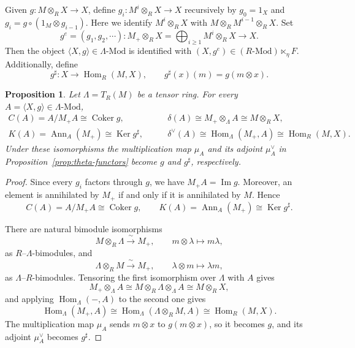 \documentclass[11pt,reqno]{amsart}
\numberwithin{equation}{section}
\newtheorem{proposition}[theorem]{Proposition}
\newcommand{\Hom}{\operatorname{Hom}}
\newcommand{\Coker}{\operatorname{Coker}}
\newcommand{\Ker}{\operatorname{Ker}}
\newcommand{\Mod}{\text{-}\mathrm{Mod}}
\newcommand{\Ima}{\operatorname{Im}}
\newcommand{\Ann}{\operatorname{Ann}}
\begin{document}
Given $g\colon M\otimes_RX\to X$, define $g_i\colon M^i\otimes_RX\to X$ recursively by $g_0=1_X$ and
$g_i=g\circ(1_M\otimes g_{i-1}).$
Here we identify $M^i\otimes_R X$ with $M\otimes_R M^{i-1}\otimes_R X$. Set
\[
g^e=(g_1,g_2,\cdots)
\colon M_+\otimes_RX=\bigoplus_{i\geq 1}M^i\otimes_RX\longrightarrow X.
\]
Then the object $\langle X,g\rangle \in \Lambda\Mod$ is identified with $(X,g^e)\in (R\Mod)\ltimes_\eta F$.
Additionally, define
\[
g^\sharp\colon X\longrightarrow\Hom_R(M,X),
\qquad
g^\sharp(x)(m)=g(m\otimes x).
\]





\begin{proposition}\label{prop:tensor-bimodule}
Let $\Lambda=T_R(M)$ be a tensor ring. For every $A=\langle X,g\rangle\in\Lambda\text{-Mod}$,
\begin{align*}
C(A)=A/M_+A\cong\Coker g,\qquad &\delta(A)\cong M_+\otimes_\Lambda A\cong M\otimes_RX,\\%
K(A)=\Ann_A(M_+)\cong\Ker g^\sharp,\qquad &\delta^\vee(A)\cong\Hom_\Lambda(M_+,A)\cong\Hom_R(M,X).%
\end{align*}
Under these isomorphisms the multiplication map $\mu_A$ and its adjoint $\mu_A^\vee$ in Proposition~\ref{prop:theta-functors} become $g$ and $g^\sharp$, respectively.
\end{proposition}

\begin{proof}
Since every $g_i$ factors through $g$, we have $M_+A=\Ima g$. Moreover, an element is annihilated by $M_+$ if and only if it is annihilated by $M$. Hence
\[
C(A)=A/M_+A\cong\Coker g,
\qquad
K(A)=\Ann_A(M_+)\cong\Ker g^\sharp.
\]

There are natural bimodule isomorphisms
\[
M\otimes_R\Lambda\xrightarrow{\ \sim\ }M_+,
\qquad m\otimes\lambda\longmapsto m\lambda,
\]
as $R$--$\Lambda$-bimodules, and
\[
\Lambda\otimes_RM\xrightarrow{\ \sim\ }M_+,
\qquad \lambda\otimes m\longmapsto\lambda m,
\]
as $\Lambda$--$R$-bimodules.
Tensoring the first isomorphism over $\Lambda$ with $A$ gives
\[
M_+\otimes_\Lambda A
\cong M\otimes_R\Lambda\otimes_\Lambda A
\cong M\otimes_RX,
\]
and applying $\Hom_\Lambda(-,A)$ to the second one gives
\[
\Hom_\Lambda(M_+,A)
\cong\Hom_\Lambda(\Lambda\otimes_RM,A)
\cong\Hom_R(M,X).
\]
The multiplication map $\mu_A$ sends $m\otimes x$ to $g(m\otimes x)$, so it becomes $g$, and its adjoint $\mu_A^\vee$ becomes $g^\sharp$.
\end{proof}
\end{document}
